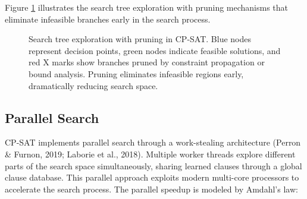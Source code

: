 \documentclass[12pt,a4paper]{article}
\begin{document}
Figure \ref{fig:searchtree} illustrates the search tree exploration with pruning mechanisms that eliminate infeasible branches early in the search process.

\begin{figure}[H]
\centering
{}
\caption{Search tree exploration with pruning in CP-SAT. Blue nodes represent decision points, green nodes indicate feasible solutions, and red X marks show branches pruned by constraint propagation or bound analysis. Pruning eliminates infeasible regions early, dramatically reducing search space.}
\label{fig:searchtree}
\end{figure}

\subsection{Parallel Search}

CP-SAT implements parallel search through a work-stealing architecture (Perron \& Furnon, 2019; Laborie et al., 2018). Multiple worker threads explore different parts of the search space simultaneously, sharing learned clauses through a global clause database. This parallel approach exploits modern multi-core processors to accelerate the search process. The parallel speedup is modeled by Amdahl's law:
\end{document}
